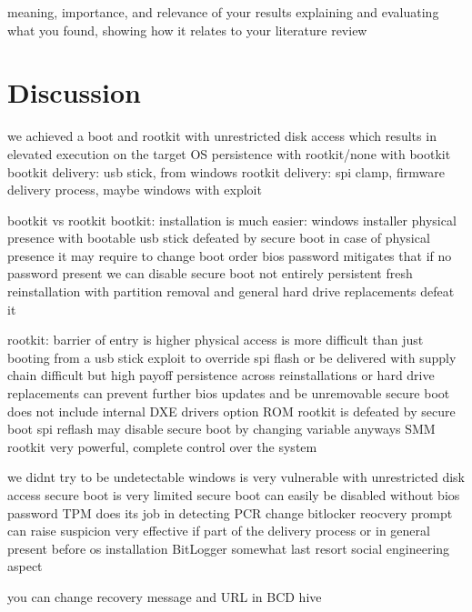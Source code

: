 

meaning, importance, and relevance of your results
explaining and evaluating what you found, showing how it relates to your literature review

\chapter{Discussion}

we achieved a boot and rootkit with unrestricted disk access which results in elevated execution on the target OS
persistence with rootkit/none with bootkit
bootkit delivery:
usb stick, from windows
rootkit delivery:
spi clamp, firmware delivery process, maybe windows with exploit

bootkit vs rootkit
bootkit:
installation is much easier:
windows installer
physical presence with bootable usb stick
defeated by secure boot
in case of physical presence it may require to change boot order
bios password mitigates that
if no password present we can disable secure boot
not entirely persistent
fresh reinstallation with partition removal and general hard drive replacements defeat it

rootkit:
barrier of entry is higher
physical access is more difficult than just booting from a usb stick
exploit to override spi flash or be delivered with supply chain difficult
but high payoff
persistence across reinstallations or hard drive replacements
can prevent further bios updates and be unremovable
secure boot does not include internal DXE drivers
option ROM rootkit is defeated by secure boot
spi reflash may disable secure boot by changing variable anyways
SMM rootkit very powerful, complete control over the system


we didnt try to be undetectable
windows is very vulnerable with unrestricted disk access
secure boot is very limited
secure boot can easily be disabled without bios password
TPM does its job in detecting PCR change
bitlocker reocvery prompt can raise suspicion
very effective if part of the delivery process or in general present before os installation
BitLogger somewhat last resort
social engineering aspect

you can change recovery message and URL in BCD hive

